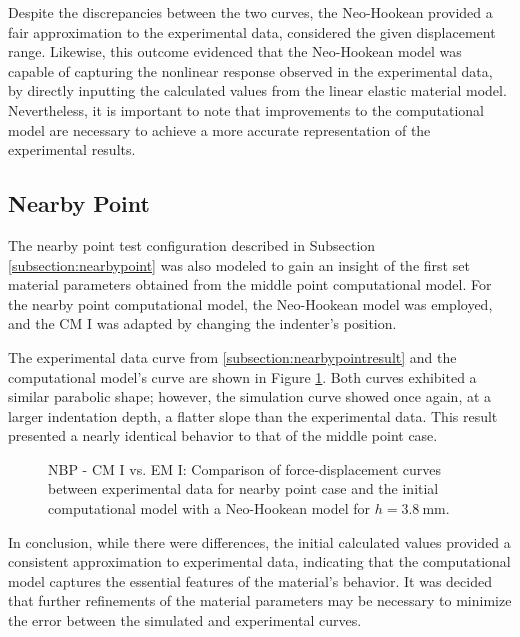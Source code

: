 Despite the discrepancies between the two curves, the Neo-Hookean provided a fair approximation to the experimental data, considered the 
given displacement range. Likewise, this outcome evidenced that the Neo-Hookean model was capable of capturing the nonlinear 
response observed in the experimental data, by directly inputting the calculated values from the linear elastic material model.
Nevertheless, it is important to note that improvements to the computational model are necessary to achieve a more
accurate representation of the experimental results.

\subsection{Nearby Point}
The nearby point test configuration described in Subsection \ref{subsection:nearbypoint} was also modeled to gain an insight 
of the first set material parameters obtained from the middle point computational model.
For the nearby point computational model, the Neo-Hookean model was employed, and the CM I was adapted by changing the 
indenter's position.

The experimental data curve from \ref{subsection:nearbypointresult} and the computational model's curve are shown in Figure 
\ref{fig:nbpointIvsCPINBNH}. Both curves exhibited a similar parabolic shape; however, the simulation curve showed once again,
at a larger indentation depth, a flatter slope than the experimental data. This result presented a 
nearly identical behavior to that of the middle point case.\\
\label{subsection:nbpcpI}
\begin{figure}%
    \centering
   \quad
   \caption[Nearby point: CM I vs. Experimental data - Neo-Hookean]{NBP - CM I vs. EM I: Comparison of force-displacement curves between experimental data for nearby point case and the initial computational model with a Neo-Hookean model for $h = \SI{3.8}{\milli \meter}$.}%
   \label{fig:nbpointIvsCPINBNH}%
\end{figure}
In conclusion, while there were differences, the initial calculated values provided a consistent approximation to experimental
data, indicating that the computational model captures the essential features of the material's behavior.
It was decided that further refinements of the material parameters may be necessary to minimize the error between the 
simulated and experimental curves.

